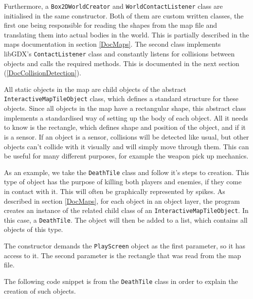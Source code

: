 \documentclass[12p]{article}
\begin{document}

Furthermore, a \texttt{Box2DWorldCreator} and \texttt{WorldContactListener} class are initialised in the same constructor. Both of them are custom written classes, the first one being responsible for reading the shapes from the map file and translating them into actual bodies in the world. This is partially described in the maps documentation in section \ref{DocMaps}. The second class implements libGDX's \texttt{ContactListener} class and constantly listens for collisions between objects and calls the required methods. This is documented in the next section (\ref{DocCollisionDetection}).

All static objects in the map are child objects of the abstract \texttt{InteractiveMapTileObject} class, which defines a standard structure for these objects. Since all objects in the map have a rectangular shape, this abstract class implements a standardised way of setting up the body of each object. All it needs to know is the rectangle, which defines shape and position of the object, and if it is a sensor. If an object is a sensor, collisions will be detected like usual, but other objects can't collide with it visually and will simply move through them. This can be useful for many different purposes, for example the weapon pick up mechanics.

As an example, we take the \texttt{DeathTile} class and follow it's steps to creation. This type of object has the purpose of killing both players and enemies, if they come in contact with it. This will often be graphically represented by spikes. As described in section \ref{DocMaps}, for each object in an object layer, the program creates an instance of the related child class of an \texttt{InteractiveMapTileObject}. In this case, a \texttt{DeathTile}. The object will then be added to a list, which contains all objects of this type.


The constructor demands the \texttt{PlayScreen} object as the first parameter, so it has access to it. The second parameter is the rectangle that was read from the map file.

The following code snippet is from the \texttt{DeathTile} class in order to explain the creation of such objects.
\end{document}
